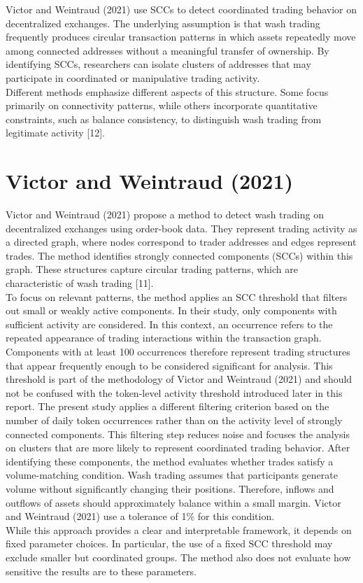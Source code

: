 \documentclass[language=english,thesis=bachelor,nosecondtitle,onesided,faculty=cb]{hsmw-thesis}
\begin{document}
Victor and Weintraud (2021) use SCCs to detect coordinated trading behavior on decentralized exchanges. The underlying assumption is that wash trading frequently produces circular transaction patterns in which assets repeatedly move among connected addresses without a meaningful transfer of ownership. By identifying SCCs, researchers can isolate clusters of addresses that may participate in coordinated or manipulative trading activity.\\
Different methods emphasize different aspects of this structure. Some focus primarily on connectivity patterns, while others incorporate quantitative constraints, such as balance consistency, to distinguish wash trading from legitimate activity [12].

	\section{Victor and Weintraud (2021)}
Victor and Weintraud (2021) propose a method to detect wash trading on decentralized exchanges using order-book data. They represent trading activity as a directed graph, where nodes correspond to trader addresses and edges represent trades.
The method identifies strongly connected components (SCCs) within this graph. These structures capture circular trading patterns, which are characteristic of wash trading [11].\\
To focus on relevant patterns, the method applies an SCC threshold that filters out small or weakly active components. In their study, only components with sufficient activity are considered. In this context, an occurrence refers to the repeated appearance of trading interactions within the transaction graph. Components with at least 100 occurrences therefore represent trading structures that appear frequently enough to be considered significant for analysis. This threshold is part of the methodology of Victor and Weintraud (2021) and should not be confused with the token-level activity threshold introduced later in this report. The present study applies a different filtering criterion based on the number of daily token occurrences rather than on the activity level of strongly connected components. This filtering step reduces noise and focuses the analysis on clusters that are more likely to represent coordinated trading behavior.
After identifying these components, the method evaluates whether trades satisfy a volume-matching condition. Wash trading assumes that participants generate volume without significantly changing their positions. Therefore, inflows and outflows of assets should approximately balance within a small margin. Victor and Weintraud (2021) use a tolerance of 1\% for this condition.\\
While this approach provides a clear and interpretable framework, it depends on fixed parameter choices. In particular, the use of a fixed SCC threshold may exclude smaller but coordinated groups. The method also does not evaluate how sensitive the results are to these parameters.
\end{document}
